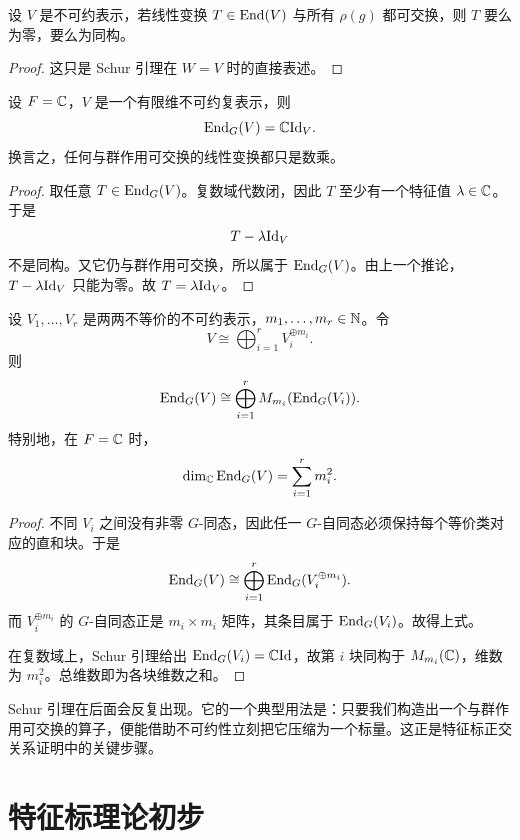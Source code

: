 \begin{corollary}
设 $V$ 是不可约表示，若线性变换 $T\in \mathrm{End}(V)$ 与所有 $\rho(g)$ 都可交换，则 $T$ 要么为零，要么为同构。
\end{corollary}

\begin{proof}
这只是 Schur 引理在 $W=V$ 时的直接表述。
\end{proof}

\begin{corollary}
设 $F=\mathbb{C}$，$V$ 是一个有限维不可约复表示，则
\[
\mathrm{End}_G(V)=\mathbb{C}\mathrm{Id}_V.
\]
换言之，任何与群作用可交换的线性变换都只是数乘。
\end{corollary}

\begin{proof}
取任意 $T\in \mathrm{End}_G(V)$。复数域代数闭，因此 $T$ 至少有一个特征值 $\lambda\in \mathbb{C}$。于是
\[
T-\lambda \mathrm{Id}_V
\]
不是同构。又它仍与群作用可交换，所以属于 $\mathrm{End}_G(V)$。由上一个推论，$T-\lambda\mathrm{Id}_V$ 只能为零。故 $T=\lambda\mathrm{Id}_V$。
\end{proof}

\begin{proposition}
设 $V_1,\dots,V_r$ 是两两不等价的不可约表示，$m_1,\dots,m_r\in \mathbb{N}$。令
\[
V\cong \bigoplus_{i=1}^r V_i^{\oplus m_i}.
\]
则
\[
\mathrm{End}_G(V)\cong \bigoplus_{i=1}^r M_{m_i}(\mathrm{End}_G(V_i)).
\]
特别地，在 $F=\mathbb{C}$ 时，
\[
\dim_{\mathbb{C}}\mathrm{End}_G(V)=\sum_{i=1}^r m_i^2.
\]
\end{proposition}

\begin{proof}
不同 $V_i$ 之间没有非零 $G$-同态，因此任一 $G$-自同态必须保持每个等价类对应的直和块。于是
\[
\mathrm{End}_G(V)\cong \bigoplus_{i=1}^r \mathrm{End}_G(V_i^{\oplus m_i}).
\]
而 $V_i^{\oplus m_i}$ 的 $G$-自同态正是 $m_i\times m_i$ 矩阵，其条目属于 $\mathrm{End}_G(V_i)$。故得上式。

在复数域上，Schur 引理给出 $\mathrm{End}_G(V_i)=\mathbb{C}\mathrm{Id}$，故第 $i$ 块同构于 $M_{m_i}(\mathbb{C})$，维数为 $m_i^2$。总维数即为各块维数之和。
\end{proof}

\begin{remark}
Schur 引理在后面会反复出现。它的一个典型用法是：只要我们构造出一个与群作用可交换的算子，便能借助不可约性立刻把它压缩为一个标量。这正是特征标正交关系证明中的关键步骤。
\end{remark}

\section{特征标理论初步}

